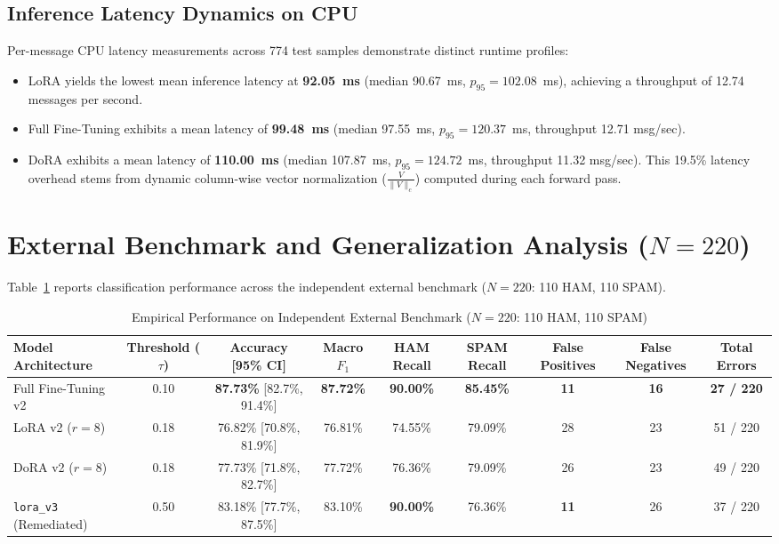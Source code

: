 \documentclass[conference]{IEEEtran}
\begin{document}
\subsection{Inference Latency Dynamics on CPU}
Per-message CPU latency measurements across 774 test samples demonstrate distinct runtime profiles:
\begin{itemize}
    \item LoRA yields the lowest mean inference latency at \textbf{92.05~ms} (median 90.67~ms, $p_{95} = 102.08$~ms), achieving a throughput of 12.74 messages per second.
    \item Full Fine-Tuning exhibits a mean latency of \textbf{99.48~ms} (median 97.55~ms, $p_{95} = 120.37$~ms, throughput 12.71 msg/sec).
    \item DoRA exhibits a mean latency of \textbf{110.00~ms} (median 107.87~ms, $p_{95} = 124.72$~ms, throughput 11.32 msg/sec). This 19.5\% latency overhead stems from dynamic column-wise vector normalization ($\frac{V}{\|V\|_c}$) computed during each forward pass.
\end{itemize}

\section{External Benchmark and Generalization Analysis ($N=220$)}
\label{sec:benchmark_analysis}

Table~\ref{tab:benchmark_results} reports classification performance across the independent external benchmark ($N=220$: 110 HAM, 110 SPAM).

\begin{table}[t]
\caption{Empirical Performance on Independent External Benchmark ($N=220$: 110 HAM, 110 SPAM)}
\label{tab:benchmark_results}
\centering
\begin{tabularx}{\textwidth}{lcccccccc}
\toprule
\textbf{Model Architecture} & \textbf{Threshold ($\tau$)} & \textbf{Accuracy [95\% CI]} & \textbf{Macro $F_1$} & \textbf{HAM Recall} & \textbf{SPAM Recall} & \textbf{False Positives} & \textbf{False Negatives} & \textbf{Total Errors} \\
\midrule
Full Fine-Tuning v2 & 0.10 & \textbf{87.73\%} [82.7\%, 91.4\%] & \textbf{87.72\%} & \textbf{90.00\%} & \textbf{85.45\%} & \textbf{11} & \textbf{16} & \textbf{27 / 220} \\
LoRA v2 ($r=8$) & 0.18 & 76.82\% [70.8\%, 81.9\%] & 76.81\% & 74.55\% & 79.09\% & 28 & 23 & 51 / 220 \\
DoRA v2 ($r=8$) & 0.18 & 77.73\% [71.8\%, 82.7\%] & 77.72\% & 76.36\% & 79.09\% & 26 & 23 & 49 / 220 \\
\midrule
\texttt{lora\_v3} (Remediated) & 0.50 & 83.18\% [77.7\%, 87.5\%] & 83.10\% & \textbf{90.00\%} & 76.36\% & \textbf{11} & 26 & 37 / 220 \\
\bottomrule
\end{tabularx}
\end{table}
\end{document}

